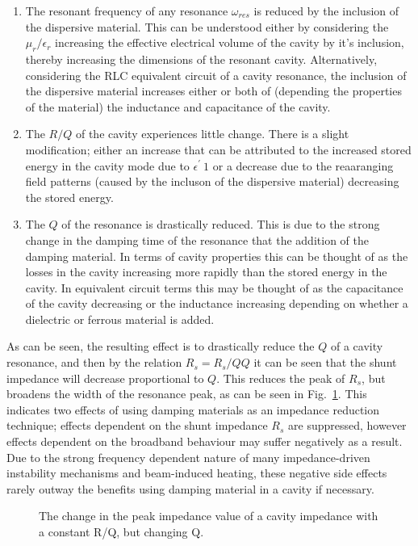 \begin{enumerate}
\item{The resonant frequency of any resonance $\omega_{res}$ is reduced by the inclusion of the dispersive material. This can be understood either by considering the $\mu_{r} / \epsilon_{r}$ increasing the effective electrical volume of the cavity by it's inclusion, thereby increasing the dimensions of the resonant cavity. Alternatively, considering the RLC equivalent circuit of a cavity resonance, the inclusion of the dispersive material increases either or both of (depending the properties of the material) the inductance and capacitance of the cavity.}
\item{The $R/Q$ of the cavity experiences little change. There is a slight modification; either an increase that can be attributed to the increased stored energy in the cavity mode due to $\epsilon^{'} \> 1$ or a decrease due to the reaaranging field patterns (caused by the incluson of the dispersive material) decreasing the stored energy.}
\item{The $Q$ of the resonance is drastically reduced. This is due to the strong change in the damping time of the resonance that the addition of the damping material. In terms of cavity properties this can be thought of as the losses in the cavity increasing more rapidly than the stored energy in the cavity. In equivalent circuit terms this may be thought of as the capacitance of the cavity decreasing or the inductance increasing depending on whether a dielectric or ferrous material is added.}
\end{enumerate} 

As can be seen, the resulting effect is to drastically reduce the $Q$ of a cavity resonance, and then by the relation $R_{s} = R_{s}/Q Q$ it can be seen that the shunt impedance will decrease proportional to $Q$. This reduces the peak of $R_{s}$, but broadens the width of the resonance peak, as can be seen in Fig.~\ref{fig:shunt_imp_q_change}. This indicates two effects of using damping materials as an impedance reduction technique; effects dependent on the shunt impedance $R_{s}$ are suppressed, however effects dependent on the broadband behaviour may suffer negatively as a result. Due to the strong frequency dependent nature of many impedance-driven instability mechanisms and beam-induced heating, these negative side effects rarely outway the benefits using damping material in a cavity if necessary.


\begin{figure}

\label{fig:shunt_imp_q_change}
\caption{The change in the peak impedance value of a cavity impedance with a constant R/Q, but changing Q.}
\end{figure}

